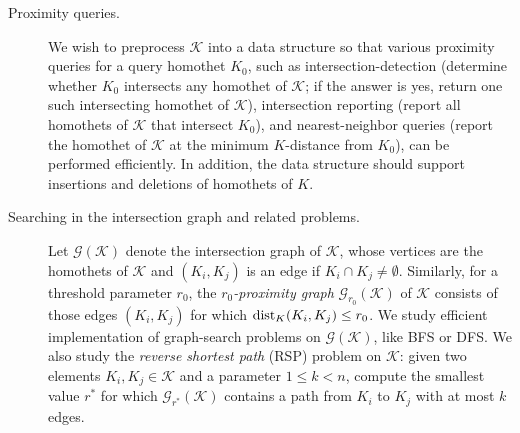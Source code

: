 \documentclass[11pt]{article}
\def\reals{{\mathbb R}}
\def\dist{{\rm dist}}
\def\G{\mathcal{G}}
\def\K{\mathcal{K}}
\theoremstyle{definition}
\begin{document}
\medskip
\begin{description}
	\item[Proximity queries.] We wish to preprocess $\K$ into a data structure so that 
                various proximity queries for a query homothet $K_0$, such as intersection-detection 
		(determine whether $K_0$ intersects any homothet of $\K$; if the answer is yes, return 
                one such intersecting homothet of $\K$), 
		intersection reporting (report all homothets of $\K$ that intersect $K_0$),
		and nearest-neighbor queries (report the homothet of $\K$ at the 
		minimum $K$-distance from $K_0$),
		can be performed efficiently. In addition, the data structure should 
		support insertions and deletions of homothets of $K$.
	\item[Searching in the intersection graph and related problems.] Let $\G(\K)$ denote the intersection graph 
		of $\K$, whose vertices are the homothets of $\K$ and $(K_i,K_j)$ is an edge if 
		$K_i\cap K_j\ne\emptyset$. Similarly, for a threshold parameter $r_0$, the
                \emph{$r_0$-proximity graph} $\G_{r_0}(\K)$ of $\K$ consists of those edges $(K_i,K_j)$
                for which $\dist_K(K_i,K_j) \le r_0$.
		We study efficient implementation of graph-search problems on $\G(\K)$,
                like BFS or DFS.
		We also study the \emph{reverse shortest path} (RSP) problem on $\K$:
		given two elements $K_i,K_j \in \K$  and a parameter $1 \le k < n$, compute
		the smallest value $r^*$ for which $\G_{r^*}(\K)$
                contains a path from $K_i$ to $K_j$ with at most $k$ edges. 
\end{description}

\end{document}
